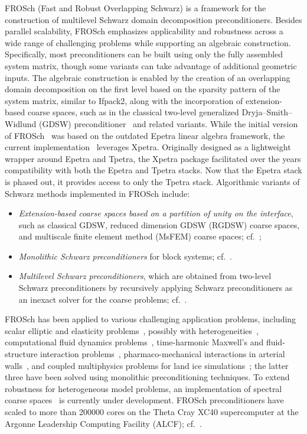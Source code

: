 FROSch (Fast and Robust Overlapping Schwarz) is a framework for the construction of multilevel Schwarz domain decomposition preconditioners. Besides parallel scalability, FROSch emphasizes applicability and robustness across a wide range of challenging problems while supporting an algebraic construction. Specifically, most preconditioners can be built using only the fully assembled system matrix, though some variants can take advantage of additional geometric inputs. The algebraic construction is enabled by the creation of an overlapping domain decomposition on the first level based on the sparsity pattern of the system matrix, similar to Ifpack2, along with the incorporation of extension-based coarse spaces, such as in the classical two-level generalized Dryja--Smith--Widlund (GDSW) preconditioner~\cite{dohrmann_domain_2008} and related variants.
While the initial version of FROSch~\cite{heinlein_parallel_2016} was based on the outdated Epetra linear algebra framework, the current implementation~\cite{heinlein_frosch_2020} leverages Xpetra. Originally designed as a lightweight wrapper around Epetra and Tpetra, the Xpetra package facilitated over the years compatibility with both the Epetra and Tpetra stacks. Now that the Epetra stack is phased out, it provides access to only the Tpetra stack. Algorithmic variants of Schwarz methods implemented in FROSch include:
\begin{itemize}
	\item \emph{Extension-based coarse spaces based on a partition of unity on the interface}, such as classical GDSW, reduced dimension GDSW (RGDSW) coarse spaces, and multiscale finite element method (MsFEM) coarse spaces; cf.~\cite{heinlein_parallel_2016,heinlein_improving_2018};
	\item \emph{Monolithic Schwarz preconditioners} for block systems; cf.~\cite{heinlein_monolithic_2019}.
	\item \emph{Multilevel Schwarz preconditioners}, which are obtained from two-level Schwarz preconditioners by recursively applying Schwarz preconditioners as an inexact solver for the coarse problems; cf.~\cite{heinlein_parallel_2022}.
\end{itemize}

FROSch has been applied to various challenging application problems, including scalar elliptic and elasticity problems~\cite{heinlein_parallel_2016}, possibly with heterogeneities~\cite{alves2024computationalstudyalgebraiccoarse}, computational fluid dynamics problems~\cite{heinlein_monolithic_2019}, time-harmonic Maxwell's and fluid-structure interaction problems~\cite{heinlein2024couplingdealiifroschsustainable}, pharmaco-mechanical interactions in arterial walls~\cite{balzani_computational_nodate}, and coupled multiphysics problems for land ice simulations~\cite{heinlein_frosch_2022}; the latter three have been solved using monolithic preconditioning techniques. To extend robustness for heterogeneous model problems, an implementation of spectral coarse spaces~\cite{heinlein_adaptive_2019} is currently under development. FROSch preconditioners have scaled to more than \num{200000} cores on the Theta Cray XC40 supercomputer at the Argonne Leadership Computing Facility (ALCF); cf.~\cite{heinlein_parallel_2022}.

